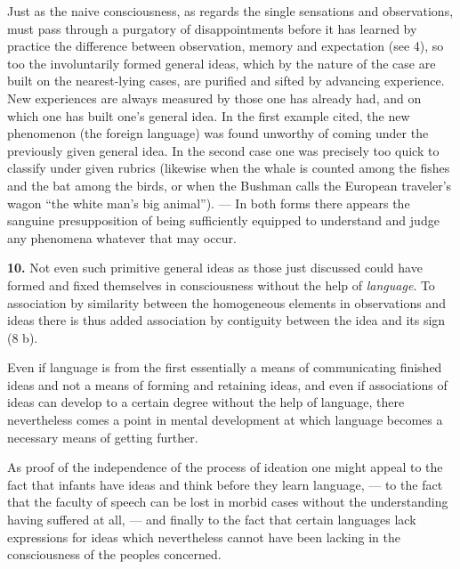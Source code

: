 \documentclass[12pt,a4paper]{book}
\newcommand{\opage}[1]{\marginnote{\footnotesize\textit{[#1]}}}
\begin{document}
Just as the naive consciousness, as regards the single sensations and
observations, must pass through a purgatory of disappointments before it
has learned by practice the difference between observation, memory and
expectation (see 4), so too the involuntarily formed general ideas,
which by the nature of the case are built on the nearest-lying cases,
are purified and sifted by advancing experience. New experiences are
always measured by those one has already had, and on which one has built
one's general idea. In the first example cited, the new phenomenon (the
foreign language) was found unworthy of coming under the previously
given general idea. In the second case one was precisely too quick to
classify under given rubrics (likewise when the whale is counted among
the fishes and the bat among the birds, or when the Bushman calls the
European traveler's wagon ``the white man's big animal''). --- In both
forms there appears the sanguine presupposition of being sufficiently
equipped to understand and judge any phenomena whatever that may occur.

\textbf{10.} Not even such primitive general ideas as those just
discussed could have formed and fixed themselves in consciousness
without the help of \emph{language}. To association by similarity
between the homogeneous elements in observations and ideas there is thus
added association by contiguity between the idea and its sign (8 b).

Even if language is from the first essentially a means of communicating
finished ideas and not a means of forming
\opage{206}and retaining ideas, and even if associations of ideas can
develop to a certain degree without the help of language, there
nevertheless comes a point in mental development at which language
becomes a necessary means of getting further.

As proof of the independence of the process of ideation one might appeal
to the fact that infants have ideas and think before they learn
language, --- to the fact that the faculty of speech can be lost in
morbid cases without the understanding having suffered at all, --- and
finally to the fact that certain languages lack expressions for ideas
which nevertheless cannot have been lacking in the consciousness of the
peoples concerned.
\end{document}
